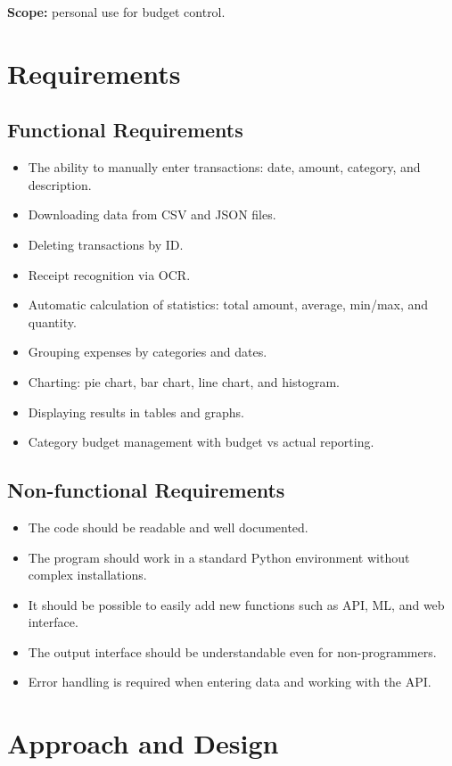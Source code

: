\documentclass[conference]{IEEEtran}
\begin{document}
\textbf{Scope:} personal use for budget control.

\section{Requirements}
\subsection{Functional Requirements}
\begin{itemize}
\item The ability to manually enter transactions: date, amount, category, and description.
\item Downloading data from CSV and JSON files.
\item Deleting transactions by ID.
\item Receipt recognition via OCR.
\item Automatic calculation of statistics: total amount, average, min/max, and quantity.
\item Grouping expenses by categories and dates.
\item Charting: pie chart, bar chart, line chart, and histogram.
\item Displaying results in tables and graphs.
\item Category budget management with budget vs actual reporting.
\end{itemize}

\subsection{Non-functional Requirements}
\begin{itemize}
\item The code should be readable and well documented.
\item The program should work in a standard Python environment without complex installations.
\item It should be possible to easily add new functions such as API, ML, and web interface.
\item The output interface should be understandable even for non-programmers.
\item Error handling is required when entering data and working with the API.
\end{itemize}

\section{Approach and Design}
\end{document}
